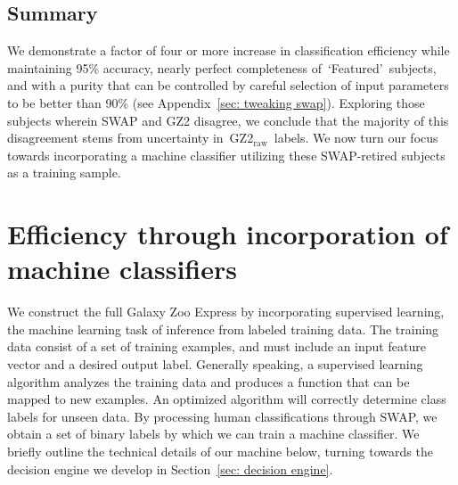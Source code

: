 \documentclass[twocolumn]{aastex6}
\newcommand{\feat}{`Featured'}
\newcommand{\raw}{GZ2$_{\text{raw}}$}
\begin{document}
\subsection{Summary}

We demonstrate a factor of four or more increase in 
classification efficiency while maintaining 95\% accuracy, nearly perfect 
completeness of~\feat~subjects, and with a purity that can be controlled by careful 
selection of input parameters to be better than 90\% (see Appendix~\ref{sec: tweaking swap}).
Exploring those subjects wherein SWAP and GZ2 disagree, we conclude that 
the majority of this disagreement stems from uncertainty in~\raw~labels.
We now turn our focus towards incorporating a machine
classifier utilizing these SWAP-retired subjects as a training sample. 


\section{Efficiency through incorporation of machine classifiers} \label{sec: machine}

We construct the full Galaxy Zoo Express by incorporating supervised 
learning, the machine learning task of inference from labeled training data. 
The training data consist of a set of training examples, and must include
an input feature vector and a desired output label.  Generally speaking,
a supervised learning algorithm analyzes the training data and produces a 
function that can be mapped to new examples. An optimized algorithm will 
correctly determine class labels for unseen data. By processing human classifications 
through SWAP, we obtain a set of binary labels by which we can train a machine 
classifier. We briefly outline the technical details of our machine below,  turning
towards the decision engine we develop in Section~\ref{sec: decision engine}. 



\end{document}
